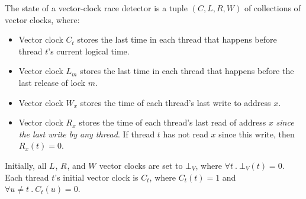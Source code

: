 \documentclass[preprint, 10pt]{sigplanconf}
\newcommand{\Tid}{t}
\newcommand{\TidU}{u}
\newcommand{\Address}{x}
\newcommand{\Lock}{m}
\newcommand{\VCFont}{}
\newcommand{\ThreadVC}[1]{\VCFont{C}_{#1}}
\newcommand{\LockVC}[1]{\VCFont{L}_{#1}}
\newcommand{\ReadVC}[1]{\VCFont{R}_{#1}}
\newcommand{\WriteVC}[1]{\VCFont{W}_{#1}}
\newcommand{\Bind}{\ .\ }
\begin{document}
The state of a vector-clock race detector is a tuple $(C, L, R, W)$ of collections of vector clocks, where:
\begin{itemize}
\item
 Vector clock $\ThreadVC{\Tid}$ stores the last time in each thread that happens before thread $\Tid$'s current logical time.
\item
 Vector clock $\LockVC{\Lock}$ stores the last time in each thread that happens before the last release of lock $\Lock$.  
\item
 Vector clock $\WriteVC{\Address}$ stores
  the time of each thread's last write to address $\Address$.
\item
 Vector clock $\ReadVC{\Address}$ stores
  the time of each thread's last read of address $\Address$ \emph{since the last write
    by any thread}.  If thread $t$ has not read $\Address$ since this write,
  then $\ReadVC{\Address}(\Tid) = 0$.
\end{itemize}

Initially, all $\LockVC{}$, $\ReadVC{}$, and $\WriteVC{}$ vector clocks are
set to $\bot_V$, where $\forall \Tid \Bind \bot_V(\Tid) = 0$.  Each thread $\Tid$'s
initial vector clock is $\ThreadVC{\Tid}$, where $\ThreadVC{\Tid}(\Tid) = 1$
and $\forall \TidU \neq \Tid \Bind \ThreadVC{\Tid}(\TidU) = 0$.  
\end{document}
